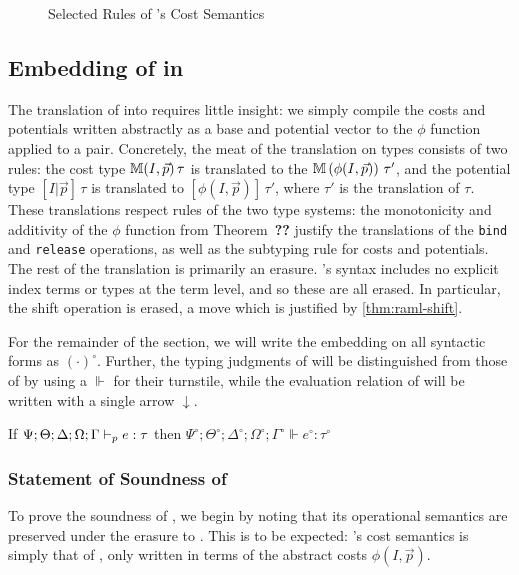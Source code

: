 \begin{figure}

\caption{Selected Rules of \dlambdaamor's Cost Semantics}
\label{fig:selected-sem-rules}
\end{figure}

\subsection{Embedding of \dlambdaamor in \lambdaamor}
The translation of \dlambdaamor into \lambdaamor requires little insight: we simply compile the costs and potentials written abstractly as a base and potential vector to the $\phi$ function applied to a pair. Concretely, the meat of the translation on types consists of two rules: the \dlambdaamor cost type $\mathbb{M}(I,\vec{p}) \, \tau$ is translated to the \lambdaamor $\mathbb{M} \left(\phi(I,\vec{p})\right)\, \tau'$, and the potential type $[I|\vec{p}] \, \tau$ is translated to $\left[\phi(I,\vec{p})\right] \, \tau'$, where $\tau'$ is the translation of $\tau$. These translations respect rules of the two type systems: the monotonicity and additivity of the $\phi$ function from Theorem~\textbf{??} justify the translations of the \texttt{bind} and \texttt{release} operations, as well as the subtyping rule for costs and potentials. The rest of the translation is primarily an erasure. \lambdaamor's syntax includes no explicit index terms or types at the term level, and so these are all erased. In particular, the shift operation is erased, a move which is justified by \autoref{thm:raml-shift}.

For the remainder of the section, we will write the embedding on all syntactic forms as $(\cdot)^\circ$. Further, the typing judgments of \lambdaamor will be distinguished from those of \dlambdaamor by using a $\Vdash$ for their turnstile, while the evaluation relation of \lambdaamor will be written with a single arrow $\downarrow$.

\begin{theorem}
\label{thm:dla-trans-sound}
If $\Psi ; \Theta ; \Delta ; \Omega ; \Gamma \vdash_p e : \tau$ then $\Psi^\circ ; \Theta^\circ ; \Delta^\circ ; \Omega^\circ ; \Gamma^\circ \Vdash e^\circ : \tau^\circ$
\end{theorem}


\subsubsection{Statement of Soundness of \dlambdaamor}
To prove the soundness of \dlambdaamor, we begin by noting that its operational semantics are preserved under the erasure to \lambdaamor. This is to be expected: \dlambdaamor's cost semantics is simply that of \lambdaamor, only written in terms of the abstract costs $\phi(I,\vec{p})$.

